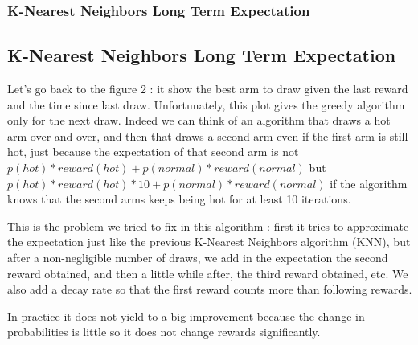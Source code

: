 \documentclass[french]{beamer}
\begin{document}
\begin{frame}
	\frametitle{K-Nearest Neighbors Long Term Expectation}
	
	\subsection{K-Nearest Neighbors Long Term Expectation}
	
	Let's go back to the figure 2 : it show the best arm to draw given the last reward and the time since last draw. Unfortunately, this plot gives the greedy algorithm only for the next draw. Indeed we can think of an algorithm that draws a hot arm over and over, and then that draws a second arm even if the first arm is still hot, just because the expectation of that second arm is not $p(hot)*reward(hot) + p(normal)*reward(normal)$ but $p(ho	t)*reward(hot)*10 + p(normal)*reward(normal)$ if the algorithm knows that the second arms keeps being hot for at least 10 iterations.
	
	This is the problem we tried to fix in this algorithm : first it tries to approximate the expectation just like the previous K-Nearest Neighbors algorithm (KNN), but after a non-negligible number of draws, we add in the expectation the second reward obtained, and then a little while after, the third reward obtained, etc. We also add a decay rate so that the first reward counts more than following rewards.
	
	In practice it does not yield to a big improvement because the change in probabilities is little so it does not change rewards significantly.
\end{frame}
\end{document}
